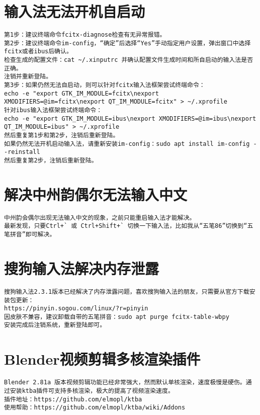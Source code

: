\documentclass[a4paper,fontset=fandol,zihao=-4,linespread=1.2,oneside]{ctexbook}
\begin{document}
\section{输入法无法开机自启动}
\begin{lstlisting}
第1步：建议终端命令fcitx-diagnose检查有无异常报错。
第2步：建议终端命令im-config，“确定”后选择“Yes”手动指定用户设置，弹出窗口中选择fcitx或者ibus后确认。
检查生成的配置文件：cat ~/.xinputrc 并确认配置文件生成时间和所自启动的输入法是否正确。
注销并重新登陆。
第3步：如果仍然无法自启动，则可以针对fcitx输入法框架尝试终端命令：
echo -e "export GTK_IM_MODULE=fcitx\nexport XMODIFIERS=@im=fcitx\nexport QT_IM_MODULE=fcitx" > ~/.xprofile
针对ibus输入法框架尝试终端命令：
echo -e "export GTK_IM_MODULE=ibus\nexport XMODIFIERS=@im=ibus\nexport QT_IM_MODULE=ibus" > ~/.xprofile
然后重复第1步和第2步，注销后重新登陆。
如果仍然无法开机启动输入法，请重新安装im-config：sudo apt install im-config --reinstall
然后重复第2步，注销后重新登陆。
\end{lstlisting}

\section{解决中州韵偶尔无法输入中文}
\begin{lstlisting}
中州韵会偶尔出现无法输入中文的现象，之前只能重启输入法才能解决。
最新发现，只要Ctrl+` 或 Ctrl+Shift+` 切换一下输入法，比如我从“五笔86”切换到“五笔拼音”即可解决。
\end{lstlisting}

\section{搜狗输入法解决内存泄露}
\begin{lstlisting}
搜狗输入法2.3.1版本已经解决了内存泄露问题，喜欢搜狗输入法的朋友，只需要从官方下载安装包更新：
https://pinyin.sogou.com/linux/?r=pinyin
因皮肤不兼容，建议卸载自带的五笔拼音：sudo apt purge fcitx-table-wbpy
安装完成后注销系统，重新登陆即可。
\end{lstlisting}

\section{Blender视频剪辑多核渲染插件}
\begin{lstlisting}
Blender 2.81a 版本视频剪辑功能已经非常强大，然而默认单核渲染，速度极慢是硬伤。通过安装ktba插件可支持多核渲染，极大的提高了视频渲染速度。
插件地址：https://github.com/elmopl/ktba
使用帮助：https://github.com/elmopl/ktba/wiki/Addons
\end{lstlisting}
\end{document}
